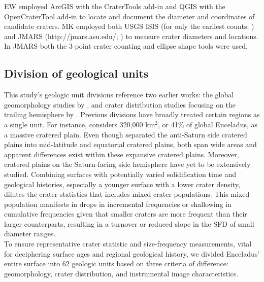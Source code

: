 \documentclass[preprint,11pt,3p,times,authoryear]{elsarticle}
\begin{document}
EW employed ArcGIS with the CraterTools add-in \citep{Kneissl2011} and QGIS with the OpenCraterTool add-in \citep{Heyer2023} to locate and document the diameter and coordinates of candidate craters. MK employed both USGS ISIS (for only the earliest counts; \citealt{Kirchoff2009}) and JMARS (http://jmars.asu.edu/; \citealt{Christensen2009}) to measure crater diameters and locations.  In JMARS both the 3-point crater counting and ellipse shape tools were used.

\subsection{Division of geological units}
\label{sub:gu}
This study’s geologic unit divisions reference two earlier works: the global geomorphology studies by \citet{CrowWillard2015}, and crater distribution studies focusing on the trailing hemisphere by \citet{Kirchoff2009}. Previous divisions have broadly treated certain regions as a single unit. 
For instance, \citet{CrowWillard2015} considers 320,000 km$^{2}$, or 41\% of global Enceladus, as a massive cratered plain. Even though \citet{Kirchoff2009} separated the anti-Saturn side cratered plains into mid-latitude and equatorial cratered plains, both span wide areas and apparent differences exist within these expansive cratered plains. 
Moreover, cratered plains on the Saturn-facing side hemisphere have yet to be extensively studied. 
Combining surfaces with potentially varied solidification time and geological histories, especially a younger surface with a lower crater density, dilutes the crater statistics that includes mixed crater populations. 
This mixed population manifests in drops in incremental frequencies or shallowing in cumulative frequencies given that smaller craters are more frequent than their larger counterparts, resulting in a turnover or reduced slope in the SFD of small diameter ranges. \\

To ensure representative crater statistic and size-frequency measurements, vital for deciphering surface ages and regional geological history, we divided Enceladus’ entire surface into 62 geologic units based on three criteria of difference: geomorphology, crater distribution, and instrumental image characteristics.
\end{document}
